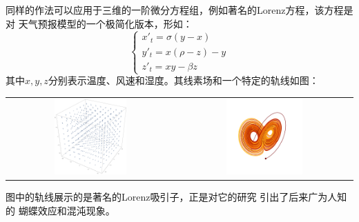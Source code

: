 \begin{shaded}
	同样的作法可以应用于三维的一阶微分方程组，例如著名的Lorenz方程，该方程是对
	天气预报模型的一个极简化版本，形如：
	$$
		\left\{\begin{array}{l}
			x'_t=\sigma(y-x)\\
			y'_t=x(\rho-z)-y\\
			z'_t=xy-\beta z
		\end{array}\right.
	$$
	其中$x,y,z$分别表示温度、风速和湿度。其线素场和一个特定的轨线如图：
	\begin{center}
		\begin{tabular}{cc}
			\includegraphics[width=0.45\textwidth]{./images/ch7/lorenzDF.pdf}&
			\includegraphics[width=0.45\textwidth]{./images/ch7/LorenzAtractor.pdf}\\
		\end{tabular}
	\end{center}
	图中的轨线展示的是著名的{\kaishu Lorenz吸引子}，正是对它的研究
	引出了后来广为人知的	{\kaishu 蝴蝶效应}和{\kaishu 混沌现象}。
\end{shaded}

